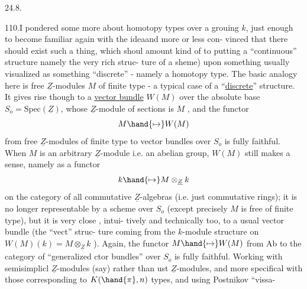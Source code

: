 

24.8.

110.\quad I pondered some more about homotopy types over a grouing $k$,
just enough to become familiar again with the idea\hand{,}and more or less con-%
vinced that there should exist such a thing, which  shoul amount\hand{,}
kind of\hand{,} to putting a ``continuous'' structure namely the very rich struc-%
ture of a sheme) upon something usually visualized as something ``discrete''
- namely a homotopy type. The basic analogy here is free $\underline{Z}$-modules $M$
of finite type - a typical case of a ``\uline{discrete}'' structure. It gives
rise though to a \uline{vector bundle} $W(M)$ over the absolute base $S_o=\mathrm{Spec}(\underline{Z})$,
whose $\underline{Z}$-module of sections is $M$ , and the functor
\[ M \hand{\mapsto} W(M) \]
from free $\underline{Z}$-modules of finite type to vector bundles over $S_o$ is fully
faithful. When $M$ is an arbitrary $\underline{Z}$-module i.e. an abelian group, $W(M)$
still makes a sense, namely as a functor
\[ k \hand{\mapsto} M\otimes_{\underline{Z}}k \]
on the category of all commutative $\underline{Z}$-algebras (i.e. just commutative
rings); it is no longer representable by a scheme over $S_o$ (except 
precisely  $M$ is free of finite type), but it is very close , intui-%
tively and technically too, to a usual vector bundle (the ``vect'' struc-%
ture coming from the $k$-module structure on $W(M)(k) = M\otimes_{\underline{Z}}k$ ). Again,
the functor $M\hand{\mapsto} W(M)$ from Ab to the category of ``generalized ctor
bundles'' over $S_o$ is fully faithful. Working with semisimplicl
$\underline{Z}$-modules (say) rather than ust $\underline{Z}$-modules, and more specifical
with those corresponding to $K(\hand{\pi},n)$ types, and using Postnikov ``vissa-%
